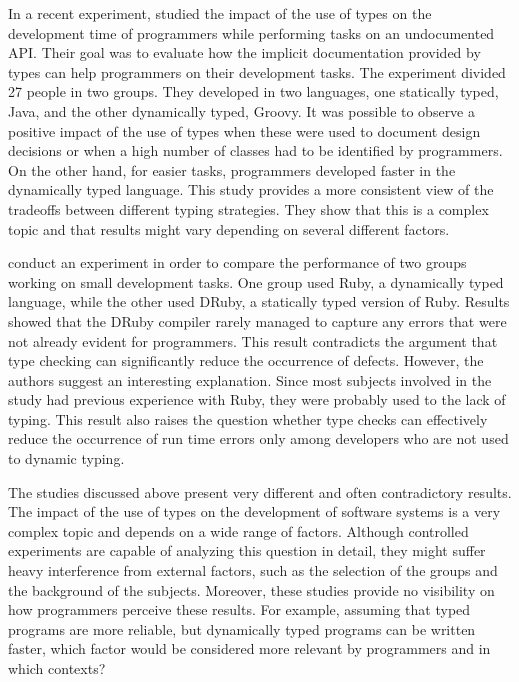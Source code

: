 \documentclass[msc]{ppgccufmg}
\begin{document}
In a recent experiment, \cite{Hanenberg13} studied the impact of the use of types on the development time of programmers while performing tasks on an undocumented API.
Their goal was to evaluate how the implicit documentation provided by types can help programmers on their development tasks.
The experiment divided 27 people in two groups.
They developed in two languages, one statically typed, Java, and the other dynamically typed, Groovy.
It was possible to observe a positive impact of the use of types when these were used to document design decisions or when a high number of classes had to be identified by programmers.
On the other hand, for easier tasks, programmers developed faster in the dynamically typed language.
This study provides a more consistent view of the tradeoffs between different typing strategies.
They show that this is a complex topic and that results might vary depending on several different factors.

\cite{ruby_vs_druby} conduct an experiment in order to compare the performance of two groups working on small development tasks.
One group used Ruby, a dynamically typed language, while the other used DRuby, a statically typed version of Ruby. 
Results showed that the DRuby compiler rarely managed to capture any errors that were not already evident for programmers.
This result contradicts the argument that type checking can significantly reduce the occurrence of defects.
However, the authors suggest an interesting explanation.
Since most subjects involved in the study had previous experience with Ruby, they were probably used to the lack of typing.
This result also raises the question whether type checks can effectively reduce the occurrence of run time errors only among developers who are not used to dynamic typing.

The studies discussed above present very different and often contradictory results.
The impact of the use of types on the development of software systems is a very complex topic and depends on a wide range of factors.
Although controlled experiments are capable of analyzing this question in detail, they might suffer heavy interference from external factors, such as the selection of the groups and the background of the subjects.
Moreover, these studies provide no visibility on how programmers perceive these results.
For example, assuming that typed programs are more reliable, but dynamically typed programs can be written faster, which factor would be considered more relevant by programmers and in which contexts?
\end{document}
